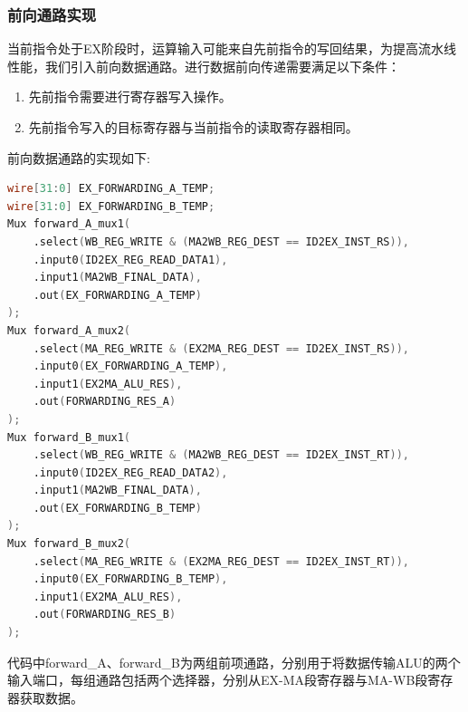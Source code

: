 \documentclass[UTF8]{ctexart}
\begin{document}
\subsubsection{前向通路实现}
当前指令处于EX阶段时，运算输入可能来自先前指令的写回结果，为提高流水线性能，我们引入前向数据通路。进行数据前向传递需要满足以下条件：
\begin{enumerate}
    \item 先前指令需要进行寄存器写入操作。
    \item 先前指令写入的目标寄存器与当前指令的读取寄存器相同。
\end{enumerate}\par
前向数据通路的实现如下:
\begin{lstlisting}[language=verilog]
wire[31:0] EX_FORWARDING_A_TEMP;
wire[31:0] EX_FORWARDING_B_TEMP;
Mux forward_A_mux1(
    .select(WB_REG_WRITE & (MA2WB_REG_DEST == ID2EX_INST_RS)),
    .input0(ID2EX_REG_READ_DATA1),
    .input1(MA2WB_FINAL_DATA),
    .out(EX_FORWARDING_A_TEMP)
);
Mux forward_A_mux2(
    .select(MA_REG_WRITE & (EX2MA_REG_DEST == ID2EX_INST_RS)),
    .input0(EX_FORWARDING_A_TEMP),
    .input1(EX2MA_ALU_RES),
    .out(FORWARDING_RES_A)
);
Mux forward_B_mux1(
    .select(WB_REG_WRITE & (MA2WB_REG_DEST == ID2EX_INST_RT)),
    .input0(ID2EX_REG_READ_DATA2),
    .input1(MA2WB_FINAL_DATA),
    .out(EX_FORWARDING_B_TEMP)
);
Mux forward_B_mux2(
    .select(MA_REG_WRITE & (EX2MA_REG_DEST == ID2EX_INST_RT)),
    .input0(EX_FORWARDING_B_TEMP),
    .input1(EX2MA_ALU_RES),
    .out(FORWARDING_RES_B)
);
\end{lstlisting}\par
代码中forward\_A、forward\_B为两组前项通路，分别用于将数据传输ALU的两个输入端口，每组通路包括两个选择器，分别从EX-MA段寄存器与MA-WB段寄存器获取数据。
\end{document}
